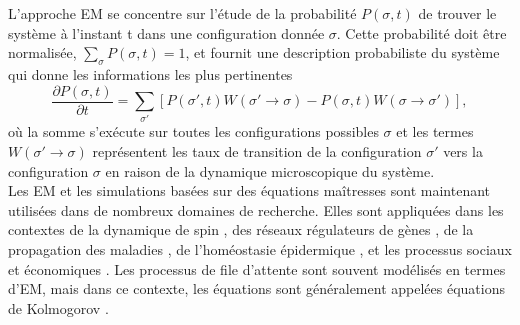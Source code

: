 L'approche EM se concentre sur l'étude de la probabilité $P(\sigma,t)$ de trouver le système à l'instant t dans une configuration donnée $\sigma$. Cette probabilité doit être normalisée, $\sum_{\sigma}P(\sigma,t)=1$, et fournit une description probabiliste du système qui donne les informations les plus pertinentes
\begin{equation}
\frac{\partial P(\sigma,t)}{\partial t}=\sum_{\sigma'}[P(\sigma',t)W(\sigma'\rightarrow \sigma)-P(\sigma,t)W(\sigma\rightarrow \sigma')],
\end{equation}
où la somme s'exécute sur toutes les configurations possibles $\sigma$ et les termes $W(\sigma'\rightarrow \sigma)$ représentent les taux de transition de la configuration $\sigma'$ vers la configuration $\sigma$ en raison de la dynamique microscopique du système.\\ 
Les EM et les simulations basées sur des équations maîtresses sont maintenant utilisées dans de nombreux domaines de recherche. Elles sont appliquées dans les contextes de la dynamique de spin \cite{Glauber1963,Kawasaki1966-1,Kawasaki1966-2,Kawasaki1966-3}, des réseaux régulateurs de gènes \cite{Walczak-al2009,Rao-al2002,Tsimring2014}, de la propagation des maladies \cite{Bailey1950,Rock2014}, de l'homéostasie épidermique \cite{Clayton-al2007}, et les processus sociaux et économiques \cite{Weidlich-Braun1992}. Les processus de file d'attente sont souvent modélisés en termes d'EM, mais dans ce contexte, les équations sont généralement appelées équations de Kolmogorov \cite{Gross-al2008}. 

